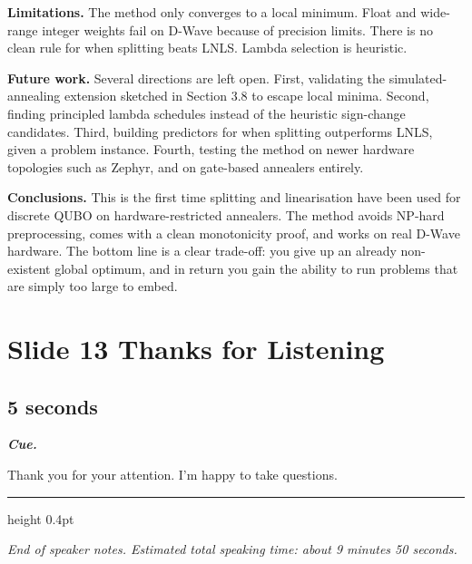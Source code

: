 \documentclass[11pt,a4paper]{article}
\newenvironment{cue}{%
  \par\noindent
  \begin{minipage}{\linewidth}
  \color{muted}\small\itshape
  \textbf{\color{accent}\upshape Cue.}~%
}{%
  \end{minipage}\par\medskip
}
\begin{document}
\textbf{Limitations.} The method only converges to a local minimum. Float and wide-range integer weights fail on D-Wave because of precision limits. There is no clean rule for when splitting beats LNLS. Lambda selection is heuristic.

\textbf{Future work.} Several directions are left open. First, validating the simulated-annealing extension sketched in Section 3.8 to escape local minima. Second, finding principled lambda schedules instead of the heuristic sign-change candidates. Third, building predictors for when splitting outperforms LNLS, given a problem instance. Fourth, testing the method on newer hardware topologies such as Zephyr, and on gate-based annealers entirely.

\textbf{Conclusions.} This is the first time splitting and linearisation have been used for discrete QUBO on hardware-restricted annealers. The method avoids NP-hard preprocessing, comes with a clean monotonicity proof, and works on real D-Wave hardware. The bottom line is a clear trade-off: you give up an already non-existent global optimum, and in return you gain the ability to run problems that are simply too large to embed.

\section*{Slide 13 \quad Thanks for Listening}
\subsection*{5 seconds}

\begin{cue}
Thank you for your attention. I'm happy to take questions.
\end{cue}

\vspace{1em}
\hrule height 0.4pt
\vspace{0.6em}
\begin{center}
\small\itshape\color{muted}
End of speaker notes. Estimated total speaking time: about 9 minutes 50 seconds.
\end{center}
\end{document}
